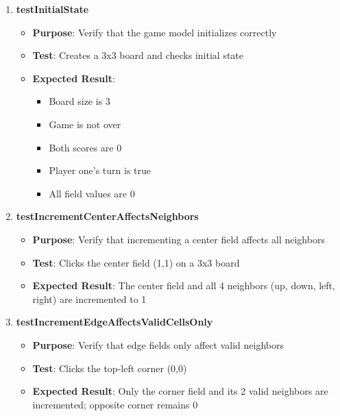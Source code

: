 \documentclass[12pt,a4paper]{article}
\begin{document}
\begin{enumerate}
    \item \textbf{testInitialState}
    \begin{itemize}
        \item \textbf{Purpose}: Verify that the game model initializes correctly
        \item \textbf{Test}: Creates a 3x3 board and checks initial state
        \item \textbf{Expected Result}: 
        \begin{itemize}
            \item Board size is 3
            \item Game is not over
            \item Both scores are 0
            \item Player one's turn is true
            \item All field values are 0
        \end{itemize}
    \end{itemize}
    
    \item \textbf{testIncrementCenterAffectsNeighbors}
    \begin{itemize}
        \item \textbf{Purpose}: Verify that incrementing a center field affects all neighbors
        \item \textbf{Test}: Clicks the center field (1,1) on a 3x3 board
        \item \textbf{Expected Result}: The center field and all 4 neighbors (up, down, left, right) are incremented to 1
    \end{itemize}
    
    \item \textbf{testIncrementEdgeAffectsValidCellsOnly}
    \begin{itemize}
        \item \textbf{Purpose}: Verify that edge fields only affect valid neighbors
        \item \textbf{Test}: Clicks the top-left corner (0,0)
        \item \textbf{Expected Result}: Only the corner field and its 2 valid neighbors are incremented; opposite corner remains 0
    \end{itemize}
    

\end{enumerate}
\end{document}
